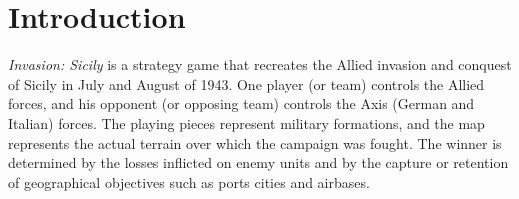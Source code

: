 \section{Introduction}

\textit{Invasion: Sicily} is a strategy game that recreates the Allied invasion and conquest of Sicily in July and August of 1943. One player (or team) controls the Allied forces, and his opponent (or opposing team) controls the Axis (German and Italian) forces. The playing pieces represent military formations, and the map represents the actual terrain over which the campaign was fought. The winner is determined by the losses inflicted on enemy units and by the capture or retention of geographical objectives such as ports cities and airbases.
